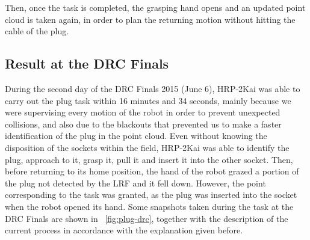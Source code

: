 		Then, once the task is completed, the grasping hand opens and an updated point cloud is taken again,
		in order to plan the returning motion without hitting the cable of the plug.
		
	\subsection{Result at the DRC Finals}
		
		During the second day of the DRC Finals 2015 (June 6), HRP-2Kai was able to carry out
		the plug task within 16 minutes and 34 seconds, mainly because we were supervising every motion of the
		robot in order to prevent unexpected collisions, and also due to the blackouts that prevented us to make
		a faster identification of the plug in the point cloud.
		Even without knowing the disposition of the sockets within the field, HRP-2Kai was able to identify the
		plug, approach to it, grasp it, pull it and insert it into the other socket.
		Then, before returning to its home position, the hand of the robot grazed a portion of the plug not
		detected by the LRF and it fell down.
		However, the point corresponding to the task was granted, as the plug was inserted into the socket
		when the robot opened its hand.
		Some snapshots taken during the task at the DRC Finals are shown in \figurename~\ref{fig:plug-drc},
		together with the description of the current process in accordance with the explanation given before.
		
